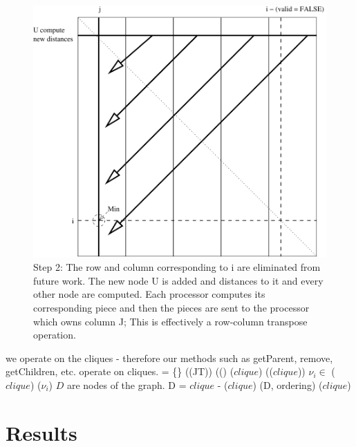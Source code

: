 \documentclass[letterpaper,12pt]{article}
\begin{document}
\begin{figure}
\centering 
\includegraphics[]{fig_mat3.pdf}
\caption{Step 2: The row and column corresponding to i are eliminated
  from future work. The new node U is added and distances to it and
  every other node are computed. Each processor computes its
  corresponding piece and then the pieces are sent to the processor
  which owns column J; This is effectively a row-column transpose operation.}
\label{fig:mat_2}
\end{figure}

\begin{codebox} 
  \zi \Comment we operate on the cliques - therefore our methods such
  \zi \Comment as getParent, remove, getChildren, etc. operate on
  \zi \Comment cliques. 
  \zi
  \zi {} = \{\}
  \zi {}((JT))
  \zi {}(()
  \zi
  \zi {}($clique$)
  \zi \> \If (($clique$))
  \zi \Then
  \zi \For $\nu_i \in$ ($clique$)
  \zi \Do
  \zi \> ($\nu_i$)
  \zi \End
  \zi \Else
  \zi \Comment $D$ are nodes of the graph.
  \zi \> D = $clique$ - ($clique$)
  \zi \> (D, ordering)
  \zi \> ($clique$)
  \zi \End
  \zi \End
\end{codebox} 




\section{Results}
\end{document}
